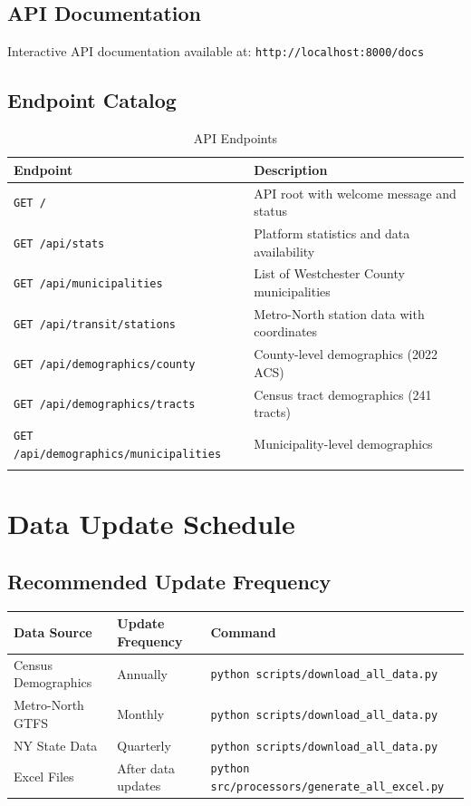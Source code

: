 \documentclass[11pt,letterpaper]{article}
\begin{document}
\subsection{API Documentation}
Interactive API documentation available at: \texttt{http://localhost:8000/docs}

\subsection{Endpoint Catalog}

\begin{longtable}{p{5cm}p{10cm}}
\toprule
\textbf{Endpoint} & \textbf{Description} \\
\midrule
\endhead

\texttt{GET /} & 
API root with welcome message and status \\

\texttt{GET /api/stats} & 
Platform statistics and data availability \\

\texttt{GET /api/municipalities} & 
List of Westchester County municipalities \\

\texttt{GET /api/transit/stations} & 
Metro-North station data with coordinates \\

\texttt{GET /api/demographics/county} & 
County-level demographics (2022 ACS) \\

\texttt{GET /api/demographics/tracts} & 
Census tract demographics (241 tracts) \\

\texttt{GET /api/demographics/municipalities} & 
Municipality-level demographics \\

\bottomrule
\caption{API Endpoints}
\end{longtable}

\section{Data Update Schedule}

\subsection{Recommended Update Frequency}

\begin{table}[h]
\centering
\begin{tabular}{lll}
\toprule
\textbf{Data Source} & \textbf{Update Frequency} & \textbf{Command} \\
\midrule
Census Demographics & Annually & \texttt{python scripts/download\_all\_data.py} \\
Metro-North GTFS & Monthly & \texttt{python scripts/download\_all\_data.py} \\
NY State Data & Quarterly & \texttt{python scripts/download\_all\_data.py} \\
Excel Files & After data updates & \texttt{python src/processors/generate\_all\_excel.py} \\
\bottomrule
\end{tabular}
\end{table}
\end{document}
